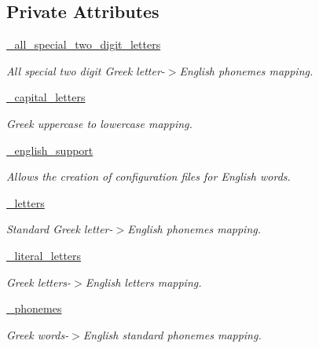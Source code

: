 \subsection*{Private Attributes}
\begin{DoxyCompactItemize}
\item 
\hyperlink{classrapp__speech__detection__sphinx4_1_1greek__support_1_1GreekSupport_a533b86fa7f9105c49d0a729140d76c27}{\-\_\-all\-\_\-special\-\_\-two\-\_\-digit\-\_\-letters}
\begin{DoxyCompactList}\small\item\em All special two digit Greek letter-\/$>$English phonemes mapping. \end{DoxyCompactList}\item 
\hyperlink{classrapp__speech__detection__sphinx4_1_1greek__support_1_1GreekSupport_a69f45d4217814cba24edcb2e5597956b}{\-\_\-capital\-\_\-letters}
\begin{DoxyCompactList}\small\item\em Greek uppercase to lowercase mapping. \end{DoxyCompactList}\item 
\hyperlink{classrapp__speech__detection__sphinx4_1_1greek__support_1_1GreekSupport_aff5fd96d6423b28163b900c2ea06e188}{\-\_\-english\-\_\-support}
\begin{DoxyCompactList}\small\item\em Allows the creation of configuration files for English words. \end{DoxyCompactList}\item 
\hyperlink{classrapp__speech__detection__sphinx4_1_1greek__support_1_1GreekSupport_a6115cc5d04ce7f8e891f5b112f8d4151}{\-\_\-letters}
\begin{DoxyCompactList}\small\item\em Standard Greek letter-\/$>$English phonemes mapping. \end{DoxyCompactList}\item 
\hyperlink{classrapp__speech__detection__sphinx4_1_1greek__support_1_1GreekSupport_a553a5e8b07dc6b3b9b83a2f814535204}{\-\_\-literal\-\_\-letters}
\begin{DoxyCompactList}\small\item\em Greek letters-\/$>$English letters mapping. \end{DoxyCompactList}\item 
\hyperlink{classrapp__speech__detection__sphinx4_1_1greek__support_1_1GreekSupport_ac660aeb52c669c9e0bd81d9cac50c3d6}{\-\_\-phonemes}
\begin{DoxyCompactList}\small\item\em Greek words-\/$>$English standard phonemes mapping. \end{DoxyCompactList}\item 

\end{DoxyCompactItemize}
